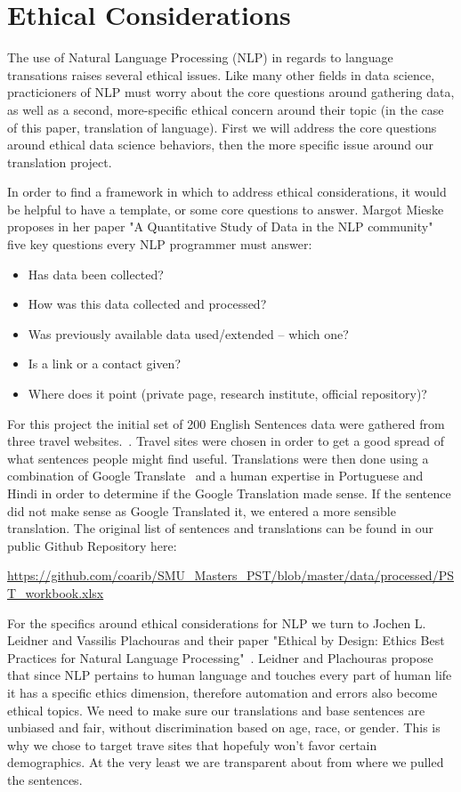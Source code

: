 \documentclass[runningheads]{llncs}
\begin{document}
	\section{Ethical Considerations}
	The use of Natural Language Processing (NLP) in regards to language transations raises several ethical issues. Like many other fields in data science, practicioners of NLP must worry about the core questions around gathering data, as well as a second, more-specific ethical concern around their topic (in the case of this paper, translation of language). First we will address the core questions around ethical data science behaviors, then the more specific issue around our translation project.

In order to find a framework in which to address ethical considerations, it would be helpful to have a template, or some core questions to answer. Margot Mieske proposes in her paper "A Quantitative Study of Data in the NLP community" five key questions every NLP programmer must answer: ~\cite{ref_url8}


\begin{itemize}
	\item Has data been collected? 
	\item How was this data collected and processed? 
 	\item Was previously available data used/extended – which one? 
	\item Is a link or a contact given? 
	\item Where does it point (private page, research institute, official repository)?
\end{itemize}

For this project the initial set of 200 English Sentences data were gathered from three travel websites.~\cite{ref_url11,ref_url12,ref_url13}. Travel sites were chosen in order to get a good spread of what sentences people might find useful. Translations were then done using a combination of Google Translate~\cite{ref_url14} and a human expertise in Portuguese and Hindi in order to determine if the Google Translation made sense. If the sentence did not make sense as Google Translated it, we entered a more sensible translation. The original list of sentences and translations can be found in our public Github Repository here:

\url{https://github.com/coarib/SMU_Masters_PST/blob/master/data/processed/PST_workbook.xlsx}


For the specifics around ethical considerations for NLP we turn to Jochen L. Leidner and Vassilis Plachouras and their paper "Ethical by Design: Ethics Best Practices for Natural Language Processing"~\cite{ref_url15}.  Leidner and Plachouras propose that since NLP pertains to human language and touches every part of human life it has a specific ethics dimension, therefore automation and errors also become ethical topics. We need to make sure our translations and base sentences are unbiased and fair, without discrimination based on age, race, or gender. This is why we chose to target trave sites that hopefuly won't favor certain demographics. At the very least we are transparent about from where we pulled the sentences.
\end{document}
